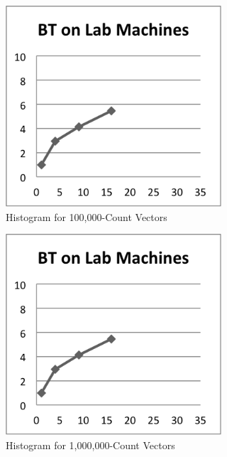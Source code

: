 \documentclass{acm_proc_article-sp}
\begin{document}
\begin{figure}[tbp]
  \centering
  \caption{Histogram for 100,000-Count Vectors}
	\label{hist100000}
  \includegraphics[width=19pc]{Pics/BT.png}
\end{figure}

\begin{figure}[tbp]
  \centering
  \caption{Histogram for 1,000,000-Count Vectors}
	\label{hist1000000}
  \includegraphics[width=19pc]{Pics/BT.png}
\end{figure}
\end{document}
